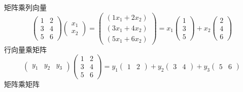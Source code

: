 矩阵乘列向量
\[ \begin{pmatrix}
		1 & 2 \\ 3 & 4 \\ 5 & 6
	\end{pmatrix} \begin{pmatrix}
		x_1 \\ x_2
	\end{pmatrix} = \begin{pmatrix}
		(1x_1 + 2x_2) \\ (3x_1 + 4x_2) \\ (5x_1 + 6x_2)
	\end{pmatrix} = x_1 \begin{pmatrix}
		1 \\ 3 \\ 5
	\end{pmatrix}+ x_2\begin{pmatrix}
		2 \\ 4 \\ 6
	\end{pmatrix} \]
行向量乘矩阵
\[ \begin{pmatrix}
		y_1 & y_2 & y_3
	\end{pmatrix} \begin{pmatrix}
		1 & 2 \\ 3 & 4 \\ 5 & 6
	\end{pmatrix} = y_1 \begin{pmatrix}
		1 & 2
	\end{pmatrix} + y_2\begin{pmatrix}
		3 & 4
	\end{pmatrix} + y_3\begin{pmatrix}
		5 & 6
	\end{pmatrix} \]
矩阵乘矩阵
